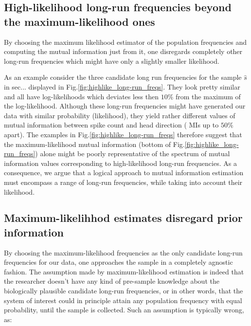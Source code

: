 \subsection*{High-likelihood long-run frequencies beyond the maximum-likelihood ones}
By choosing the maximum likelihood estimator of the population frequencies and computing the mutual information just from it, one disregards completely other long-run frequencies which might have only a slightly smaller likelihood. 

As an example consider the three candidate long run frequencies for the sample $\hat{s}$ in sec... displayed in Fig.\ref{fig:highlike_long-run_freqs}. They look pretty similar and all have log-likelihoods which deviates less then $10\%$ from the maximum of the log-likelihood. Although these long-run frequencies might have generated our data with similar probability (likelihood), they yield rather different values of mutual information between spike count and head direction ( MIs up to $50\%$ apart). The examples in Fig.\ref{fig:highlike_long-run_freqs} therefore suggest that the maximum-likelihood mutual information (bottom of Fig.\ref{fig:highlike_long-run_freqs}) alone  might be poorly representative of the spectrum of mutual information values corresponding to high-likelihood long-run frequencies. As a consequence, we argue that a logical approach to mutual information estimation must encompass a range of long-run frequencies, while taking into account their likelihood. 


\subsection*{Maximum-likelihhod estimates disregard prior information} 

By choosing the maximum-likelihood frequencies as the only candidate long-run frequencies for our data, one approaches the sample in a completely agnostic fashion. The assumption made by maximum-likelihood estimation is indeed that the researcher doesn't have any kind of pre-sample knowledge about the biologically plausible candidate long-run frequencies, or in other words, that the system of interest could in principle attain any population frequency with equal probability, until the sample is collected. 
Such an assumption is typically wrong, as:

